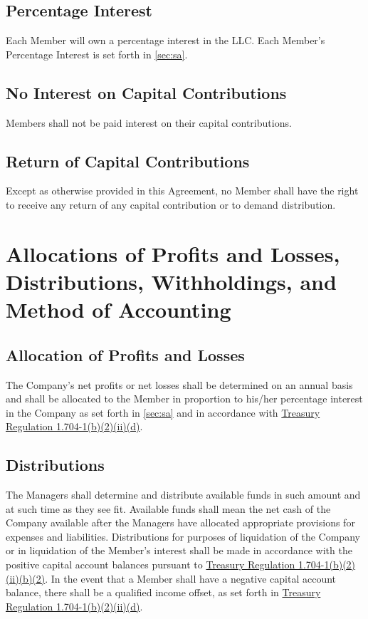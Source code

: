 \documentclass[11pt,onecolumn]{article}
\newcommand{\sa}{\autoref{sec:sa}}
\begin{document}
\subsection{Percentage Interest}

Each Member will own a percentage interest in the LLC. Each Member's Percentage Interest is set forth in \sa{}.

\subsection{No Interest on Capital Contributions}

Members shall not be paid interest on their capital contributions.

\subsection{Return of Capital Contributions}

Except as otherwise provided in this Agreement, no Member shall have the right to receive any return of any capital contribution or to demand distribution.

\section{Allocations of Profits and Losses, Distributions, Withholdings, and Method of Accounting} \label{sec:allocationsetc}

\subsection{Allocation of Profits and Losses} \label{sec:allocations}

The Company's net profits or net losses shall be determined on an annual basis and shall be allocated to the Member in proportion to his/her percentage interest in the Company as set forth in \sa{} and in accordance with \href{https://www.gpo.gov/fdsys/pkg/CFR-2015-title26-vol10/pdf/CFR-2015-title26-vol10.pdf#page=451}{Treasury Regulation 1.704-1(b)(2)(ii)(d)}.

\subsection{Distributions} \label{sec:distributions}

The Managers shall determine and distribute available funds in such amount and at such time as they see fit. Available funds shall mean the net cash of the Company available after the Managers have allocated appropriate provisions for expenses and liabilities. Distributions for purposes of liquidation of the Company or in liquidation of the Member's interest shall be made in accordance with the positive capital account balances pursuant to \href{https://www.gpo.gov/fdsys/pkg/CFR-2015-title26-vol10/pdf/CFR-2015-title26-vol10.pdf#page=450}{Treasury Regulation 1.704-1(b)(2)(ii)(b)(2)}. In the event that a Member shall have a negative capital account balance, there shall be a qualified income offset, as set forth in \href{https://www.gpo.gov/fdsys/pkg/CFR-2015-title26-vol10/pdf/CFR-2015-title26-vol10.pdf#page=451}{Treasury Regulation 1.704-1(b)(2)(ii)(d)}.
\end{document}
